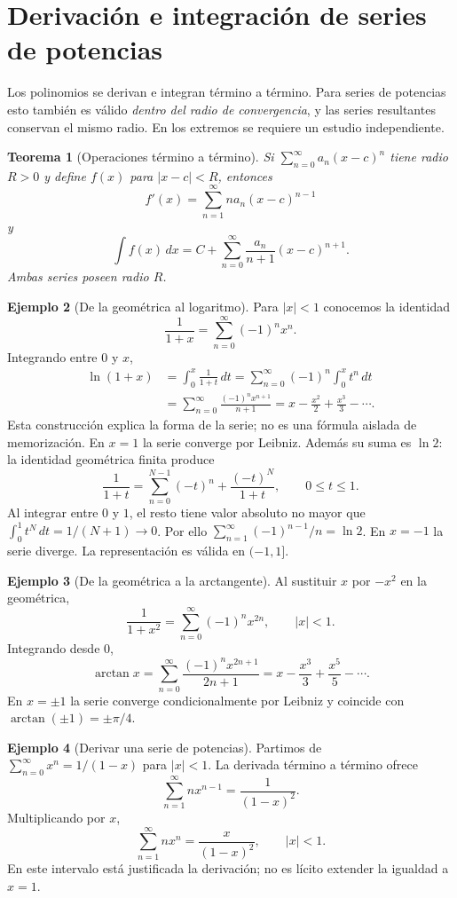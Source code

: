 \documentclass[12pt]{article}
\newtheorem{teorema}{Teorema}[section]
\theoremstyle{definition}
\newtheorem{ejemplo}[teorema]{Ejemplo}
\theoremstyle{remark}
\newcommand{\dd}{\,dx}
\begin{document}
\section{Derivación e integración de series de potencias}
Los polinomios se derivan e integran término a término. Para series de potencias esto también es válido \emph{dentro del radio de convergencia}, y las series resultantes conservan el mismo radio. En los extremos se requiere un estudio independiente.
\begin{teorema}[Operaciones término a término]
Si $\sum_{n=0}^\infty a_n(x-c)^n$ tiene radio $R>0$ y define $f(x)$ para $|x-c|<R$, entonces
\[\boxed{f'(x)=\sum_{n=1}^\infty n a_n(x-c)^{n-1}}\]
y
\[\boxed{\int f(x)\dd=C+\sum_{n=0}^\infty\frac{a_n}{n+1}(x-c)^{n+1}.}\]
Ambas series poseen radio $R$.
\end{teorema}
\begin{ejemplo}[De la geométrica al logaritmo]
Para $|x|<1$ conocemos la identidad
\[\frac1{1+x}=\sum_{n=0}^\infty(-1)^n x^n.\]
Integrando entre $0$ y $x$,
\begin{align*}
\ln(1+x)&=\int_0^x\frac1{1+t}\,dt
=\sum_{n=0}^\infty(-1)^n\int_0^x t^n\,dt\\
&=\sum_{n=0}^\infty\frac{(-1)^n x^{n+1}}{n+1}
=\boxed{x-\frac{x^2}{2}+\frac{x^3}{3}-\cdots}.
\end{align*}
Esta construcción explica la forma de la serie; no es una fórmula aislada de memorización. En $x=1$ la serie converge por Leibniz. Además su suma es $\ln2$: la identidad geométrica finita produce
\[\frac1{1+t}=\sum_{n=0}^{N-1}(-t)^n+\frac{(-t)^N}{1+t},\qquad 0\le t\le1.\]
Al integrar entre $0$ y $1$, el resto tiene valor absoluto no mayor que $\int_0^1 t^N\,dt=1/(N+1)\to0$. Por ello $\sum_{n=1}^\infty(-1)^{n-1}/n=\ln2$. En $x=-1$ la serie diverge. La representación es válida en $(-1,1]$.
\end{ejemplo}
\begin{ejemplo}[De la geométrica a la arctangente]
Al sustituir $x$ por $-x^2$ en la geométrica,
\[\frac1{1+x^2}=\sum_{n=0}^\infty(-1)^n x^{2n},\qquad |x|<1.\]
Integrando desde $0$,
\[\arctan x=\boxed{\sum_{n=0}^\infty\frac{(-1)^n x^{2n+1}}{2n+1}}
=x-\frac{x^3}{3}+\frac{x^5}{5}-\cdots.\]
En $x=\pm1$ la serie converge condicionalmente por Leibniz y coincide con $\arctan(\pm1)=\pm\pi/4$.
\end{ejemplo}
\begin{ejemplo}[Derivar una serie de potencias]
Partimos de $\sum_{n=0}^\infty x^n=1/(1-x)$ para $|x|<1$. La derivada término a término ofrece
\[\sum_{n=1}^\infty nx^{n-1}=\frac1{(1-x)^2}.\]
Multiplicando por $x$,
\[\boxed{\sum_{n=1}^\infty nx^n=\frac{x}{(1-x)^2}},\qquad |x|<1.\]
En este intervalo está justificada la derivación; no es lícito extender la igualdad a $x=1$.
\end{ejemplo}
\end{document}
